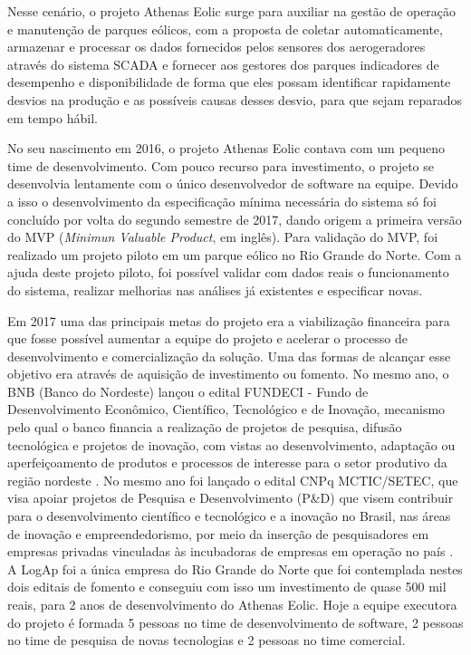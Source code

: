 Nesse cenário, o projeto Athenas Eolic surge para auxiliar na gestão de operação e manutenção de parques eólicos, com a proposta de coletar automaticamente, armazenar e processar os dados fornecidos pelos sensores dos aerogeradores através do sistema SCADA e fornecer aos gestores dos parques indicadores de desempenho e disponibilidade de forma que eles possam identificar rapidamente desvios na produção e as possíveis causas desses desvio, para que sejam reparados em tempo hábil. 

No seu nascimento em 2016, o projeto Athenas Eolic contava com um pequeno time de desenvolvimento. Com pouco recurso para investimento, o projeto se desenvolvia lentamente com o único desenvolvedor de software na equipe. Devido a isso o desenvolvimento da especificação mínima necessária do sistema só foi concluído por volta do segundo semestre de 2017, dando origem a primeira versão do MVP (\textit{Minimun Valuable Product}, em inglês). Para validação do MVP, foi realizado um projeto piloto em um parque eólico no Rio Grande do Norte. Com a ajuda deste projeto piloto, foi possível validar com dados reais o funcionamento do sistema, realizar melhorias nas análises já existentes e especificar novas.

Em 2017 uma das principais metas do projeto era a viabilização financeira para que fosse possível aumentar a equipe do projeto e acelerar o processo de desenvolvimento e comercialização da solução. Uma das formas de alcançar esse objetivo era através de aquisição de investimento ou fomento. No mesmo ano, o BNB (Banco do Nordeste) lançou o edital FUNDECI - Fundo de Desenvolvimento Econômico, Científico, Tecnológico e de Inovação, mecanismo pelo qual o banco financia a realização de projetos de pesquisa, difusão tecnológica e projetos de inovação, com vistas ao desenvolvimento, adaptação ou aperfeiçoamento de produtos e processos de interesse para o setor produtivo da região nordeste \cite{bnb-fundeci}. No mesmo ano foi lançado o edital CNPq MCTIC/SETEC, que visa apoiar projetos de Pesquisa e Desenvolvimento (P\&D) que visem contribuir para o desenvolvimento científico e tecnológico e a inovação no Brasil, nas áreas de inovação e empreendedorismo, por meio da inserção de pesquisadores em empresas privadas vinculadas às incubadoras de empresas em operação no país \cite{cnpq-mctic}. A LogAp foi a única empresa do Rio Grande do Norte que foi contemplada nestes dois editais de fomento e conseguiu com isso um investimento de quase 500 mil reais, para 2 anos de desenvolvimento do Athenas Eolic. Hoje a equipe executora do projeto é formada 5 pessoas no time de desenvolvimento de software, 2 pessoas no time de pesquisa de novas tecnologias e 2 pessoas no time comercial.

